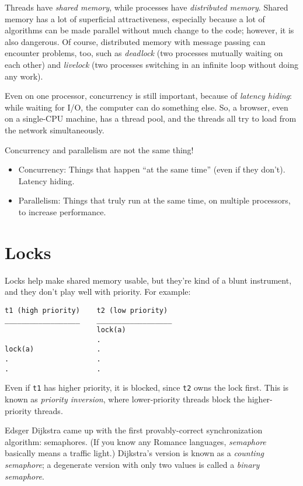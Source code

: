 \documentclass[twoside]{article}
\begin{document}
Threads have \textit{shared memory}, while processes have \textit{distributed memory}. Shared memory has a lot of superficial attractiveness, especially because a lot of algorithms can be made parallel without much change to the code; however, it is also dangerous. Of course, distributed memory with message passing can encounter problems, too, such as \textit{deadlock} (two processes mutually waiting on each other) and \textit{livelock} (two processes switching in an infinite loop without doing any work).

Even on one processor, concurrency is still important, because of \textit{latency hiding}: while waiting for I/O, the computer can do something else. So, a browser, even on a single-CPU machine, has a thread pool, and the threads all try to load from the network simultaneously.

Concurrency and parallelism are not the same thing!

\begin{itemize}
\item Concurrency: Things that happen ``at the same time'' (even if they don't). Latency hiding.
\item Parallelism: Things that truly run at the same time, on multiple processors, to increase performance.
\end{itemize}

\section{Locks}

Locks help make shared memory usable, but they're kind of a blunt instrument, and they don't play well with priority. For example:

\begin{verbatim}
t1 (high priority)    t2 (low priority)
__________________    __________________
                      lock(a)
                      .
lock(a)               .
.                     .
.                     .
\end{verbatim}

Even if \texttt{t1} has higher priority, it is blocked, since \texttt{t2} owns the lock first. This is known as \textit{priority inversion}, where lower-priority threads block the higher-priority threads.

Edsger Dijkstra came up with the first provably-correct synchronization algorithm: semaphores. (If you know any Romance languages, \textit{semaphore} basically means a traffic light.) Dijkstra's version is known as a \textit{counting semaphore}; a degenerate version with only two values is called a \textit{binary semaphore}.
\end{document}
